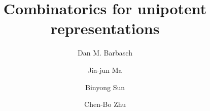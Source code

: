 \documentclass[12pt,a4paper]{amsart}
\numberwithin{equation}{section}
\theoremstyle{remark}
\begin{document}
\title[]{Combinatorics for unipotent representations}

\author [D. Barbasch] {Dan M. Barbasch}
\address{the Department of Mathematics\\
  310 Malott Hall, Cornell University, Ithaca, New York 14853 }

\author [J.-J. Ma] {Jia-jun Ma}
\address{School of Mathematical Sciences\\
  Shanghai Jiao Tong University\\
  800 Dongchuan Road, Shanghai, 200240, China} 

\author [B. Sun] {Binyong Sun}
\address{Academy of Mathematics and Systems Science\\
  Chinese Academy of Sciences\\
  Beijing, 100190, China} 

\author [C.-B. Zhu] {Chen-Bo Zhu}
\address{Department of Mathematics\\
  National University of Singapore\\
  10 Lower Kent Ridge Road, Singapore 119076} 




 

\maketitle


\tableofcontents
\end{document}
